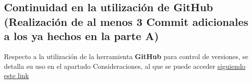 \subsection{Continuidad en la utilización de GitHub (Realización de al menos 3 Commit adicionales a los ya hechos en la parte A)}

Respecto a la utilización de la herramienta \textbf{GitHub} para control de versiones, se detalla su uso en el apartado Consideraciones, al que se puede acceder {\color{MyGreen}\hyperref[cons:utilizaciongithub]{siguiendo este link}}
